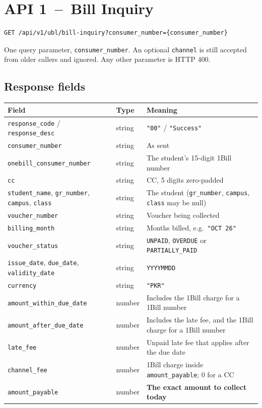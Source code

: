 \documentclass[11pt]{article}
\begin{document}
\section{API 1 \,--\, Bill Inquiry}
\begin{lstlisting}
GET /api/v1/ubl/bill-inquiry?consumer_number={consumer_number}
\end{lstlisting}
One query parameter, \texttt{consumer\_number}. An optional \texttt{channel} is still accepted from older callers and
ignored. Any other parameter is HTTP 400.

\subsection{Response fields}
\begin{longtable}{@{}p{} p{} p{}@{}}
\toprule
\textbf{Field} & \textbf{Type} & \textbf{Meaning} \\
\midrule
\endhead
\texttt{response\_code} / \texttt{response\_desc} & string & \texttt{"00"} / \texttt{"Success"} \\
\texttt{consumer\_number} & string & As sent \\
\texttt{onebill\_consumer\_number} & string & The student's 15-digit 1Bill number \\
\texttt{cc} & string & CC, 5 digits zero-padded \\
\texttt{student\_name}, \texttt{gr\_number}, \texttt{campus}, \texttt{class} & string & The student (\texttt{gr\_number}, \texttt{campus}, \texttt{class} may be null) \\
\texttt{voucher\_number} & string & Voucher being collected \\
\texttt{billing\_month} & string & Months billed, e.g.\ \texttt{"OCT 26"} \\
\texttt{voucher\_status} & string & \texttt{UNPAID}, \texttt{OVERDUE} or \texttt{PARTIALLY\_PAID} \\
\texttt{issue\_date}, \texttt{due\_date}, \texttt{validity\_date} & string & \texttt{YYYYMMDD} \\
\texttt{currency} & string & \texttt{"PKR"} \\
\texttt{amount\_within\_due\_date} & number & Includes the 1Bill charge for a 1Bill number \\
\texttt{amount\_after\_due\_date} & number & Includes the late fee, and the 1Bill charge for a 1Bill number \\
\texttt{late\_fee} & number & Unpaid late fee that applies after the due date \\
\texttt{channel\_fee} & number & 1Bill charge inside \texttt{amount\_payable}; 0 for a CC \\
\texttt{amount\_payable} & number & \textbf{The exact amount to collect today} \\
\bottomrule
\end{longtable}
\end{document}
